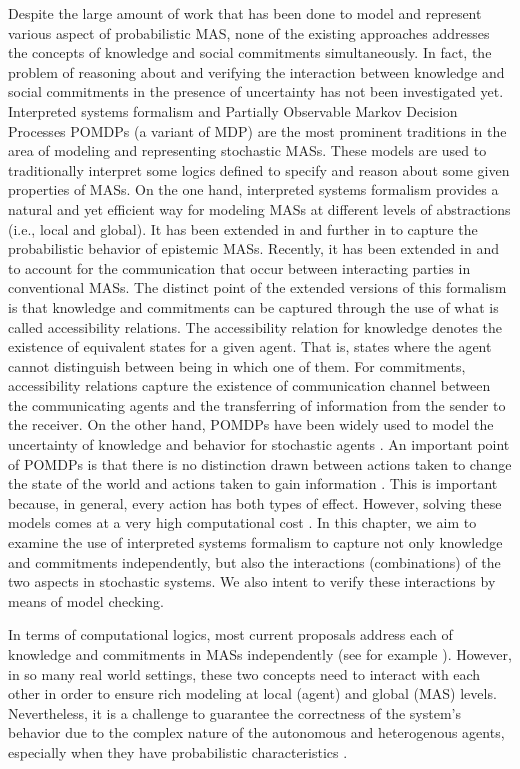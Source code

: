 Despite the large amount of work that has been done to model and represent various aspect of probabilistic MAS, none of the existing approaches addresses the concepts of knowledge and social commitments simultaneously. In fact, the problem of reasoning about and verifying the interaction between knowledge and social commitments in the presence of uncertainty has not been investigated yet. Interpreted systems formalism \cite{Fagin1995}
and Partially Observable Markov Decision Processes POMDPs (a
variant of MDP) are the most prominent traditions in the area of
modeling and representing stochastic MASs. These models are used
to traditionally interpret some logics defined to specify and
reason about some given properties of MASs. On the one hand,
interpreted systems formalism provides a natural and yet efficient
way for modeling MASs at different levels of abstractions (i.e.,
local and global). It has been extended in \cite{Halpern2003} and
further in \cite{Wan2012,Wan2013} to capture the probabilistic
behavior of epistemic MASs. Recently, it has been extended in
\cite{Bentahar2012} and \cite{El-Menshawy2013a} to account for the
communication that occur between interacting parties in
conventional MASs. The distinct point of the extended versions of
this formalism is that knowledge and commitments can be captured
through the use of what is called accessibility relations. The
accessibility relation for knowledge denotes the existence of
equivalent states for a given agent. That is, states where the
agent cannot distinguish between being in which one of them. For
commitments, accessibility relations capture the existence of
communication channel between the communicating agents and the
transferring of information from the sender to the receiver. On
the other hand, POMDPs have been widely used to model the
uncertainty of knowledge and behavior for stochastic agents
\cite{Huang2011}. An important point of POMDPs is that there is no distinction drawn between actions taken to change the state of the world and actions taken to gain information \cite{Kaelbling1996}. This is important
because, in general, every action has both types of effect.
However, solving these models comes at a very high computational
cost \cite{Melo2011}. In this chapter, we aim to examine the use of interpreted systems formalism to capture not only knowledge and commitments
independently, but also the interactions (combinations) of the two
aspects in stochastic systems. We also intent to verify these
interactions by means of model checking.

In terms of computational logics, most current proposals address each of knowledge and commitments in MASs independently (see for example
\cite{Baldoni2010,Bentahar2012,Delgado2009,El-Menshawy2013a,Giordano2007,Halpern2003,Huang2011,Lomuscio2007,Pham2007,Wan2013}).
However, in so many real world settings, these two concepts need to
interact with each other in order to ensure rich modeling at local
(agent) and global (MAS) levels. Nevertheless, it is a challenge to guarantee the correctness of the system's behavior due to the complex nature of the autonomous and heterogenous agents, especially when they have probabilistic characteristics \cite{Song2012}.


